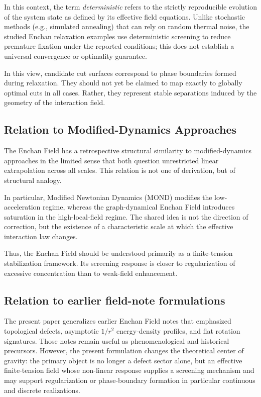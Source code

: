 \documentclass[11pt,a4paper]{article}
\begin{document}
In this context, the term \emph{deterministic} refers to the strictly reproducible evolution of the system state as defined by its effective field equations. Unlike stochastic methods (e.g., simulated annealing) that can rely on random thermal noise, the studied Enchan relaxation examples use deterministic screening to reduce premature fixation under the reported conditions; this does not establish a universal convergence or optimality guarantee.

In this view, candidate cut surfaces correspond to phase boundaries formed during relaxation. They should not yet be claimed to map exactly to globally optimal cuts in all cases. Rather, they represent stable separations induced by the geometry of the interaction field.

\subsection{Relation to Modified-Dynamics Approaches}

The Enchan Field has a retrospective structural similarity to modified-dynamics approaches in the limited sense that both question unrestricted linear extrapolation across all scales. This relation is not one of derivation, but of structural analogy.

In particular, Modified Newtonian Dynamics (MOND) modifies the low-acceleration regime, whereas the graph-dynamical Enchan Field introduces saturation in the high-local-field regime. The shared idea is not the direction of correction, but the existence of a characteristic scale at which the effective interaction law changes.

Thus, the Enchan Field should be understood primarily as a finite-tension stabilization framework. Its screening response is closer to regularization of excessive concentration than to weak-field enhancement.

\subsection{Relation to earlier field-note formulations}

The present paper generalizes earlier Enchan Field notes that emphasized topological defects, asymptotic $1/r^2$ energy-density profiles, and flat rotation signatures. Those notes remain useful as phenomenological and historical precursors. However, the present formulation changes the theoretical center of gravity: the primary object is no longer a defect sector alone, but an effective finite-tension field whose non-linear response supplies a screening mechanism and may support regularization or phase-boundary formation in particular continuous and discrete realizations.
\end{document}
